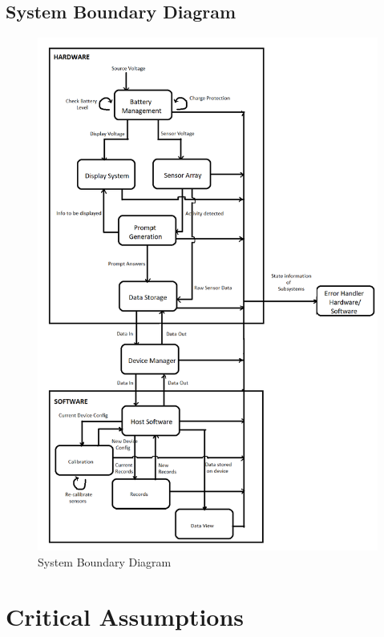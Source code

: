 \documentclass{article}
\begin{document}
\subsection{System Boundary Diagram}
\begin{figure}
	\begin{center}
		\includegraphics[width=1.0\textwidth]{SystemBoundaryDiagram}
		\caption{System Boundary Diagram}
		\label{Fig_SBD}
	\end{center}
\end{figure}
\pagebreak

\section{Critical Assumptions }
\end{document}
